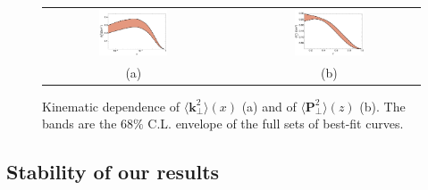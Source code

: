 \documentclass[aps,preprintnumbers,showpacs,nofootinbib,superscriptaddress,floatfix]{revtex4}
\newcommand{\T}{\perp}
\begin{document}
\begin{figure}[h!]
\centering
\begin{tabular}{ccc}
\includegraphics[width=0.40\textwidth]{plots/kT2av_compare.pdf}
&\hspace{0.001cm}
&
\includegraphics[width=0.40\textwidth]{plots/PT2av_compare.pdf}
\\
(a) && (b)
\end{tabular}
\caption{Kinematic dependence of $\big \langle \bm{k}_{\T}^2 \big \rangle (x)$
  (a) and of $\big \langle \bm{P}_{\perp}^2 \big \rangle (z)$ (b). The bands
  are the $68\%$ C.L. envelope of the full sets of best-fit
  curves.  
}
\label{f:avmomenta_68CL}
\end{figure}


\subsection{Stability of our results}
\label{ss:replica105}
\end{document}
